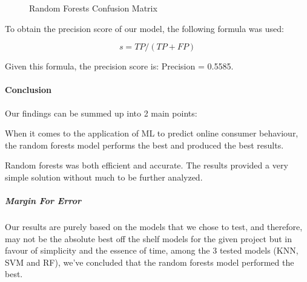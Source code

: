 \documentclass[
  letterpaper,
  DIV=11,
  numbers=noendperiod]{scrartcl}
\let\oldparagraph\paragraph
\renewcommand{\paragraph}[1]{\oldparagraph{#1}\mbox{}}
\let\oldsubparagraph\subparagraph
\renewcommand{\subparagraph}[1]{\oldsubparagraph{#1}\mbox{}}
\begin{document}
\begin{figure}[H]


\caption{\label{fig-rf\_matrix}Random Forests Confusion Matrix}

\end{figure}%

To obtain the precision score of our model, the following formula was
used:

\[ s = TP / (TP + FP) \]

Given this formula, the precision score is: Precision = 0.5585.

\paragraph{Conclusion}\label{conclusion}

Our findings can be summed up into 2 main points:

When it comes to the application of ML to predict online consumer
behaviour, the random forests model performs the best and produced the
best results.

Random forests was both efficient and accurate. The results provided a
very simple solution without much to be further analyzed.

\subparagraph{Margin For Error}\label{margin-for-error}

Our results are purely based on the models that we chose to test, and
therefore, may not be the absolute best off the shelf models for the
given project but in favour of simplicity and the essence of time, among
the 3 tested models (KNN, SVM and RF), we've concluded that the random
forests model performed the best.
\end{document}
